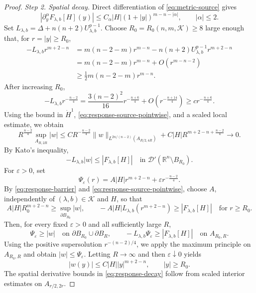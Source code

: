 \documentclass[11pt]{article}
\numberwithin{equation}{section}
\theoremstyle{remark}
\newcommand{\R}{\mathbb R}
\newcommand{\norm}[1]{\lVert #1\rVert}
\begin{document}
\begin{proof}
\emph{Step 2. Spatial decay.}
Direct differentiation of
\eqref{eq:metric-source} gives
\begin{equation}\label{eq:response-source-pointwise}
 |\partial_y^\alpha F_{\lambda,b}[H](y)|
 \le C_\alpha|H|(1+|y|)^{m-n-|\alpha|},
 \qquad |\alpha|\le2.
\end{equation}
Set \(L_{\lambda,b}=\Delta+n(n+2)U_{\lambda,b}^{p-1}\).
Choose \(R_0=R_0(n,m,\mathcal K)\ge8\) large enough that, for
\(r=|y|\ge R_0\),
\begin{equation}\label{eq:response-barrier}
 \begin{aligned}
 -L_{\lambda,b}r^{m+2-n}
 &=m(n-2-m)r^{m-n}
 -n(n+2)U_{\lambda,b}^{p-1}r^{m+2-n}\\
 &=m(n-2-m)r^{m-n}+O(r^{m-n-2})\\
 &\ge\frac12m(n-2-m)r^{m-n}.
 \end{aligned}
\end{equation}
After increasing \(R_0\),
\[
 -L_{\lambda,b}r^{-\frac{n-2}{4}}
 =\frac{3(n-2)^2}{16}r^{-\frac{n+6}{4}}
 +O(r^{-\frac{n+14}{4}})
 \ge c r^{-\frac{n+6}{4}}.
\]
{Using the bound in \(\dot H^1\),
\eqref{eq:response-source-pointwise}, and a scaled local estimate, we
obtain}
 {
\[
 R^{\frac{n-2}{4}}\sup_{A_{R,2R}}|w|
 \le{}C R^{-\frac{n-2}{4}}
 \norm{w}_{L^{2n/(n-2)}(A_{R/2,4R})}
 {}+C|H|R^{m+2-n+\frac{n-2}{4}}
 \to0.
\]
}
{By Kato's inequality,}
\[
 -L_{\lambda,b}|w|\le|F_{\lambda,b}[H]|
 \quad\text{in }\mathcal D'(\R^n\setminus B_{R_0}).
\]
For \(\varepsilon>0\), set
\[
 \Psi_\varepsilon(r)
 =A|H|r^{m+2-n}+\varepsilon r^{-\frac{n-2}{4}}.
\]
By \eqref{eq:response-barrier} and
\eqref{eq:response-source-pointwise}, choose \(A\), independently of
\((\lambda,b)\in\mathcal K\) and \(H\), so that
\[
 A|H|R_0^{m+2-n}\ge\sup_{\partial B_{R_0}}|w|,
 \qquad
 -A|H|L_{\lambda,b}(r^{m+2-n})\ge|F_{\lambda,b}[H]|
 \quad\text{for }r\ge R_0.
\]
Then, for every fixed \(\varepsilon>0\) and all sufficiently large \(R\),
\[
 \Psi_\varepsilon\ge|w|
 \quad\text{on }\partial B_{R_0}\cup\partial B_R,
 \qquad
 -L_{\lambda,b}\Psi_\varepsilon\ge|F_{\lambda,b}[H]|
 \quad\text{on }A_{R_0,R}.
\]
{Using the positive supersolution \(r^{-(n-2)/4}\), we apply
the maximum principle on \(A_{R_0,R}\) and obtain
\(|w|\le\Psi_\varepsilon\).}
Letting
\(R\to\infty\) and then \(\varepsilon\downarrow0\) yields
\begin{equation}\label{eq:response-spatial-decay}
 |w(y)|\le C|H||y|^{m+2-n},
 \qquad |y|\ge R_0.
\end{equation}
{The spatial derivative bounds in \eqref{eq:response-decay}
follow from scaled interior estimates on \(A_{r/2,2r}\).}


\end{proof}
\end{document}
